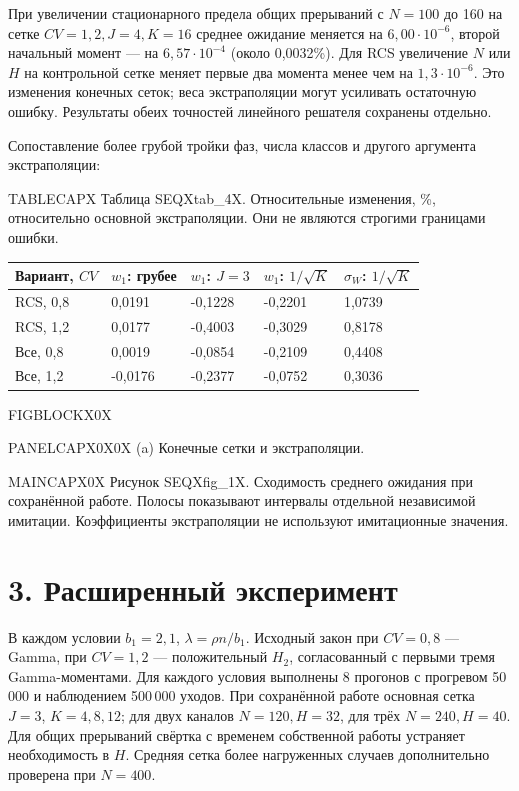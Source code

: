При увеличении стационарного предела общих прерываний с \(N=100\) до 160 на сетке \(CV=1{,}2,J=4,K=16\) среднее ожидание меняется на \(6{,}00\cdot10^{-6}\), второй начальный момент --- на \(6{,}57\cdot10^{-4}\) (около 0{,}0032\%). Для RCS увеличение \(N\) или \(H\) на контрольной сетке меняет первые два момента менее чем на \(1{,}3\cdot10^{-6}\). Это изменения конечных сеток; веса экстраполяции могут усиливать остаточную ошибку. Результаты обеих точностей линейного решателя сохранены отдельно.

Сопоставление более грубой тройки фаз, числа классов и другого аргумента экстраполяции:

\noindent TABLECAPX Таблица SEQXtab_4X. Относительные изменения, \%, относительно основной экстраполяции. Они не являются строгими границами ошибки.\par

\setlength{\tabcolsep}{2pt}
\begin{tabular}{p{4.44cm}p{2.79cm}p{2.79cm}p{2.79cm}p{2.79cm}}
\toprule
Вариант, $CV$ & $w_1$: грубее & $w_1$: $J=3$ & $w_1$: $1/\sqrt K$ & $\sigma_W$: $1/\sqrt K$ \\
\midrule
RCS, 0,8 & 0,0191 & -0,1228 & -0,2201 & 1,0739 \\
RCS, 1,2 & 0,0177 & -0,4003 & -0,3029 & 0,8178 \\
Все, 0,8 & 0,0019 & -0,0854 & -0,2109 & 0,4408 \\
Все, 1,2 & -0,0176 & -0,2377 & -0,0752 & 0,3036 \\
\bottomrule
\end{tabular}




\noindent FIGBLOCKX0X\par

\noindent PANELCAPX0X0X (a) Конечные сетки и экстраполяции.\par

\noindent MAINCAPX0X Рисунок SEQXfig_1X. Сходимость среднего ожидания при сохранённой работе. Полосы показывают интервалы отдельной независимой имитации. Коэффициенты экстраполяции не используют имитационные значения.\par
\section*{3. Расширенный эксперимент}
В каждом условии \(b_1=2{,}1\), \(\lambda=\rho n/b_1\). Исходный закон при \(CV=0{,}8\) --- Gamma, при \(CV=1{,}2\) --- положительный \(H_2\), согласованный с первыми тремя Gamma-моментами. Для каждого условия выполнены 8 прогонов с прогревом 50\,000 и наблюдением 500\,000 уходов. При сохранённой работе основная сетка \(J=3\), \(K=4,8,12\); для двух каналов \(N=120,H=32\), для трёх \(N=240,H=40\). Для общих прерываний свёртка с временем собственной работы устраняет необходимость в \(H\). Средняя сетка более нагруженных случаев дополнительно проверена при \(N=400\).

